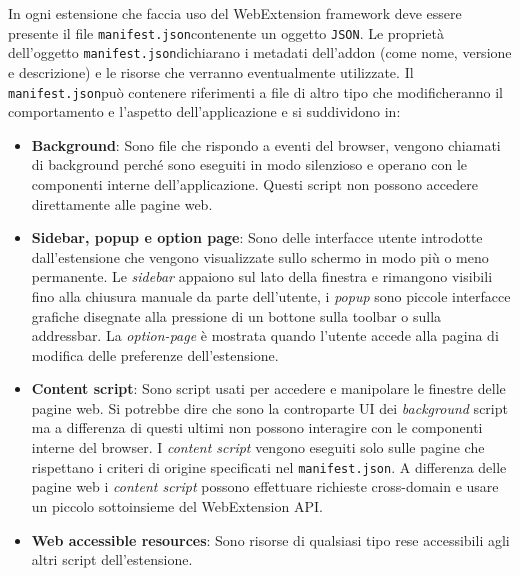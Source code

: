 \documentclass{sapthesis}
\newcommand{\bold}[1]{\textbf{#1}}
\newcommand{\code}[1]{\texttt{#1}}
\newcommand{\manifest}{\code{manifest.json}}
\begin{document}
        In ogni estensione che faccia uso del WebExtension framework deve essere presente il file \manifest contenente 
        un oggetto \code{JSON}. Le proprietà dell'oggetto \manifest dichiarano i metadati dell'addon (come nome, 
        versione e descrizione) e le risorse che verranno eventualmente utilizzate.
        Il \manifest può contenere riferimenti a file di altro tipo che modificheranno il comportamento e l'aspetto
        dell'applicazione e si suddividono in:
        \begin{itemize}
            \item \bold{Background}: Sono file che rispondo a eventi del browser, vengono chiamati di background 
                    perché sono eseguiti in modo silenzioso e operano con le componenti interne dell'applicazione.
                    Questi script non possono accedere direttamente alle pagine web.

            \item \bold{Sidebar, popup e option page}: Sono delle interfacce utente introdotte dall'estensione che
                    vengono visualizzate sullo schermo in modo più o meno permanente. Le \textit{sidebar} appaiono sul lato
                    della finestra e rimangono visibili fino alla chiusura manuale da parte dell'utente, i \textit{popup} sono
                    piccole interfacce grafiche disegnate alla pressione di un bottone sulla toolbar o sulla addressbar.
                    La \textit{option-page} è mostrata quando l'utente accede alla pagina di modifica delle preferenze
                    dell'estensione.

            \item \bold{Content script}: Sono script usati per accedere e manipolare le finestre delle pagine web. Si
                    potrebbe dire che sono la controparte UI dei \textit{background} script ma a differenza di questi
                    ultimi non possono interagire con le componenti interne del browser. I \textit{content script} 
                    vengono eseguiti solo sulle pagine che rispettano i criteri di origine specificati nel \manifest{}.
                    A differenza delle pagine web i \textit{content script} possono effettuare richieste cross-domain e
                    usare un piccolo sottoinsieme del WebExtension API.

            \item \bold{Web accessible resources}: Sono risorse di qualsiasi tipo rese accessibili agli altri script
                    dell'estensione.

        \end{itemize}
\end{document}
